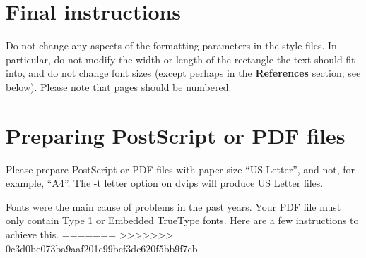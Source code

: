 \documentclass{article} %
\begin{document}
\section{Final instructions}
Do not change any aspects of the formatting parameters in the style files.
In particular, do not modify the width or length of the rectangle the text
should fit into, and do not change font sizes (except perhaps in the
\textbf{References} section; see below). Please note that pages should be
numbered.

\section{Preparing PostScript or PDF files}

Please prepare PostScript or PDF files with paper size ``US Letter'', and
not, for example, ``A4''. The -t
letter option on dvips will produce US Letter files.

Fonts were the main cause of problems in the past years. Your PDF file must
only contain Type 1 or Embedded TrueType fonts. Here are a few instructions
to achieve this.
=======
>>>>>>> 0c3d0be073ba9aaf201c99bcf3dc620f5bb9f7cb



\end{document}
